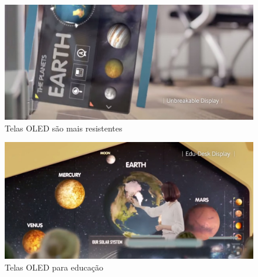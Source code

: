 \begin{figure}[!ht]
  \centering
  \includegraphics[width=.90\textwidth]{./figuras/oled-future7} 
  \caption{Telas OLED são mais resistentes}
  \label{fig:oled-future7} 
\end{figure}

\begin{figure}[!ht]
  \centering
  \includegraphics[width=.90\textwidth]{./figuras/oled-future8} 
  \caption{Telas OLED para educação}
  \label{fig:oled-future8} 
\end{figure}
